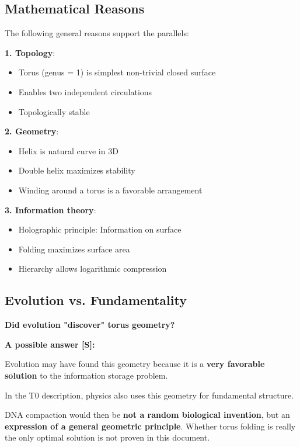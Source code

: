 	\subsection{Mathematical Reasons}

	The following general reasons support the parallels:

	\textbf{1. Topology}:
	\begin{itemize}
		\item Torus (genus = 1) is simplest non-trivial closed surface
		\item Enables two independent circulations
		\item Topologically stable
	\end{itemize}

	\textbf{2. Geometry}:
	\begin{itemize}
		\item Helix is natural curve in 3D
		\item Double helix maximizes stability
		\item Winding around a torus is a favorable arrangement
	\end{itemize}

	\textbf{3. Information theory}:
	\begin{itemize}
		\item Holographic principle: Information on surface
		\item Folding maximizes surface area
		\item Hierarchy allows logarithmic compression
	\end{itemize}

	\subsection{Evolution vs. Fundamentality}

	\begin{revolutionary}[An Interpretation]
		\textbf{Did evolution "discover" torus geometry?}

		\vspace{0.3cm}

		\textbf{A possible answer \textbf{[S]}:}

		\vspace{0.3cm}

		Evolution may have found this geometry because it is a \textbf{very favorable solution} to the information storage problem.

		\vspace{0.3cm}

		In the T0 description, physics also uses this geometry for fundamental structure.

		\vspace{0.3cm}

		DNA compaction would then be \textbf{not a random biological invention}, but an \textbf{expression of a general geometric principle}. Whether torus folding is really the only optimal solution is not proven in this document.
	\end{revolutionary}

